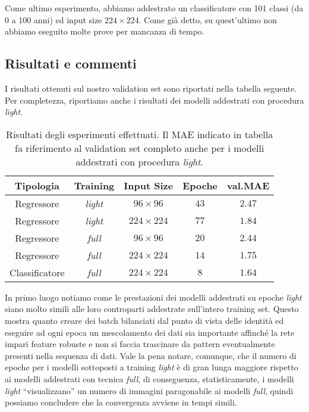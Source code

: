 Come ultimo esperimento, abbiamo addestrato un classificatore con 101 classi (da 0 a 100 anni) ed input size $224 \times 224$. Come già detto, su quest'ultimo non abbiamo eseguito molte prove per mancanza di tempo.

\subsection{Risultati e commenti}

I risultati ottenuti sul nostro validation set sono riportati nella tabella seguente. Per completezza, riportiamo anche i risultati dei modelli addestrati con procedura \emph{light}. 

\begin{table}[ht]
    \centering
    \begin{tabular}{ |c|c|c|c|c| } 
        \hline
        \textbf{Tipologia} & \textbf{Training} & \textbf{Input Size} & \textbf{Epoche} & \textbf{val.\@ MAE} \\
        \hline
        Regressore & \emph{light} & $96 \times 96$  & $43$ & $2.47$ \\
        \hline
        Regressore & \emph{light} & $224 \times 224$ & $77$ & $1.84$ \\
        \hline
        Regressore & \emph{full} & $96 \times 96$ & $20$ & $2.44$ \\
        \hline
        Regressore & \emph{full} & $224 \times 224$ & $14$ & $1.75$ \\
        \hline   
        Classificatore & \emph{full} & $224 \times 224$ & $8$ & $1.64$ \\
        \hline
    \end{tabular}
    \caption{Risultati degli esperimenti effettuati. Il MAE indicato in tabella fa riferimento al validation set completo anche per i modelli addestrati con procedura \emph{light}.}
\end{table}

In primo luogo notiamo come le prestazioni dei modelli addestrati su epoche \emph{light} siano molto simili alle loro controparti addestrate sull'intero training set. Questo mostra quanto creare dei batch bilanciati dal punto di vista delle identità ed eseguire ad ogni epoca un mescolamento dei dati sia importante affinché la rete impari feature robuste e non si faccia trascinare da pattern eventualmente presenti nella sequenza di dati. Vale la pena notare, comunque, che il numero di epoche per i modelli sottoposti a training \emph{light} è di gran lunga maggiore rispetto ai modelli addestrati con tecnica \emph{full}, di conseguenza, statisticamente, i modelli \emph{light} ``visualizzano'' un numero di immagini paragonabile ai modelli \emph{full}, quindi possiamo concludere che la convergenza avviene in tempi simili.

